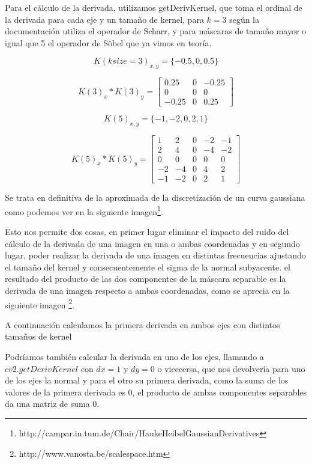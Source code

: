 \documentclass{article}
\newcommand{\img}[2]{
\noindent\makebox[\textwidth][c]{\texttt{[image: \#1]}}%
}
\begin{document}
Para el cálculo de la derivada, utilizamos getDerivKernel, que toma el ordinal de la derivada para cada eje y un tamaño de kernel, para $k=3$ según la documentación utiliza el operador de Scharr, y para máscaras de tamaño mayor o igual que 5 el operador de Söbel que ya vimos en teoría.

\[ K(ksize=3)_{x,y}=\{-0.5,0,0.5\}\]

\[K(3)_x*K(3)_y=\begin{bmatrix}
0.25 & 0 & -0.25 \\ 
0 & 0 & 0\\ 
-0.25 & 0 & 0.25 
\end{bmatrix}\]

\[ K(5)_{x,y} = \{-1,-2,0,2,1\}\]

\[K(5)_x*K(5)_y = \begin{bmatrix}
1 & 2 & 0 & -2 & -1\\ 
2 & 4 & 0 & -4 & -2\\ 
0 & 0 & 0 & 0 & 0\\ 
-2 & -4 & 0 & 4 & 2\\ 
-1 & -2 & 0 & 2 & 1
\end{bmatrix}\]

Se trata en definitiva de la aproximada de la discretización de un curva gaussiana como podemos ver en la siguiente imagen\footnote{http://campar.in.tum.de/Chair/HaukeHeibelGaussianDerivatives}. 

\img{eximg/ej2_curves}{0.5}

Esto nos permite dos cosas, en primer lugar eliminar el impacto del ruido del cálculo de la derivada de una imagen en una o ambas coordenadas y en segundo lugar, poder realizar la derivada de una imagen en distintas frecuencias ajustando el tamaño del kernel y consecuentemente el sigma de la normal subyacente. el resultado del producto de las dos componentes de la máscara separable es la derivada de una imagen respecto a ambas coordenadas, como se aprecia en la siguiente imagen \footnote{http://www.vanosta.be/scalespace.htm}.

\img{eximg/ej2_dot}{0.5}

A continuación calculamos la primera derivada en ambos ejes con distintos tamaños de kernel

\img{eximg/ej2}{1.2}

Podríamos también calcular la derivada en uno de los ejes, llamando a $cv2.getDerivKernel$ con $dx=1$ y $dy=0$ o vicecersa, que nos devolvería para uno de los ejes la normal y para el otro su primera derivada, como la suma de los valores de la primera derivada es 0, el producto de ambas componentes separables da una matriz de suma 0.
\end{document}
